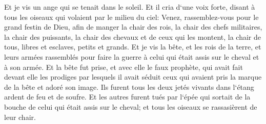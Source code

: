 \verse Et je vis un ange qui se tenait dans le soleil. Et il cria d`une voix forte, disant à tous les oiseaux qui volaient par le milieu du ciel: Venez, rassemblez-vous pour le grand festin de Dieu, 
\verse afin de manger la chair des rois, la chair des chefs militaires, la chair des puissants, la chair des chevaux et de ceux qui les montent, la chair de tous, libres et esclaves, petits et grands. 
\verse Et je vis la bête, et les rois de la terre, et leurs armées rassemblés pour faire la guerre à celui qui était assis sur le cheval et à son armée. 
\verse Et la bête fut prise, et avec elle le faux prophète, qui avait fait devant elle les prodiges par lesquels il avait séduit ceux qui avaient pris la marque de la bête et adoré son image. Ils furent tous les deux jetés vivants dans l`étang ardent de feu et de soufre. 
\verse Et les autres furent tués par l`épée qui sortait de la bouche de celui qui était assis sur le cheval; et tous les oiseaux se rassasièrent de leur chair. 

